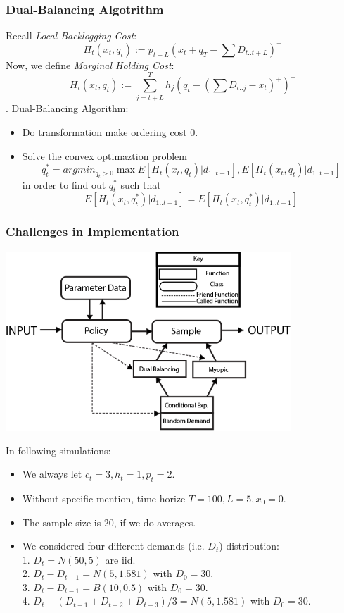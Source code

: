 \documentclass{beamer}
\begin{document}
\begin{frame}
    \frametitle{Dual-Balancing Algotrithm}
    Recall {\em Local Backlogging Cost}: 
    $$\Pi_t(x_t,q_t) := p_{t+L}(x_t + q_T - \sum D_{t..t+L})^{-}$$
    Now, we define {\em Marginal Holding Cost}:
    $$H_t(x_t,q_t) := \sum_{j = t+L}^{T} h_j (q_t - (\sum D_{t..j} - x_t)^+)^+$$.
    Dual-Balancing Algorithm:
    \begin{itemize}
      \item 
        Do transformation make ordering cost 0.
      \item
        Solve the convex optimaztion problem 
        $$q_t^* = argmin_{q_t > 0} \max{E[H_t(x_t,q_t)| d_{1..t-1}], E[\Pi_t(x_t,q_t)| d_{1..t-1}]}$$
        in order to find out $q_t^*$ such that
        $$E[H_t(x_t,q_t^*)| d_{1..t-1}] = E[\Pi_t(x_t,q_t^*)| d_{1..t-1}]$$
    \end{itemize}
\end{frame}

\begin{frame}
  \frametitle{Challenges in Implementation}    
  \begin{center}
    \includegraphics[height=2.65in]{software_diagram.png}
  \end{center}
\end{frame}

\begin{frame}
In following simulations:
    \begin{itemize}
      \item We always let $c_t = 3, h_t = 1, p_t = 2$.
      \item Without specific mention, time horize $T = 100, L = 5, x_0 = 0$.
      \item The sample size is 20, if we do averages.
      \item We considered four different demands (i.e. $D_t$) distribution:\\
            1. $D_t = N(50,5)$ are iid.\\
            2. $D_t-D_{t-1} = N(5,1.581)$ with $D_0=30$.\\
            3. $D_t-D_{t-1} = B(10,0.5)$ with $D_0=30$.\\
            4. $D_t- (D_{t-1} + D_{t-2} + D_{t-3})/3 = N(5,1.581)$ with $D_0=30$.
    \end{itemize}
\end{frame}
\end{document}
